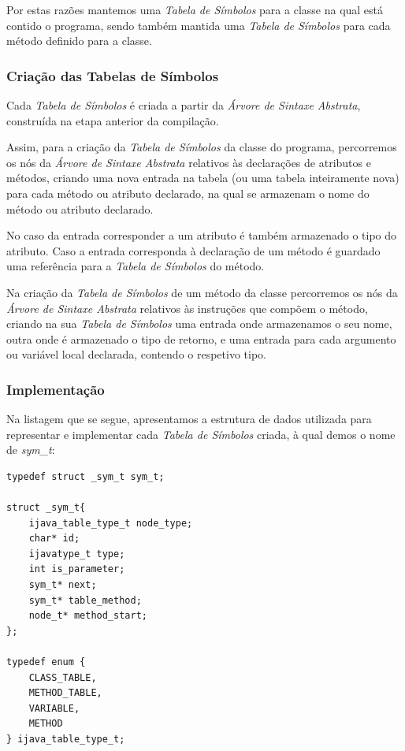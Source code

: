 \documentclass[11pt,a4paper]{article}
\begin{document}
	Por estas razões mantemos uma \emph{Tabela de Símbolos} para a classe na qual está contido o programa, sendo também mantida uma \emph{Tabela de Símbolos} para cada método definido para a classe.
	
	\subsubsection{Criação das Tabelas de Símbolos}
	
	Cada \emph{Tabela de Símbolos} é criada a partir da \emph{Árvore de Sintaxe Abstrata}, construída na etapa anterior da compilação.
	
	Assim, para a criação da \emph{Tabela de Símbolos} da classe do programa, percorremos os nós da \emph{Árvore de Sintaxe Abstrata} relativos às declarações de atributos e métodos, criando uma nova entrada na tabela (ou uma tabela inteiramente nova) para cada método ou atributo declarado, na qual se armazenam o nome do método ou atributo declarado.
	
	No caso da entrada corresponder a um atributo é também armazenado o tipo do atributo. Caso a entrada corresponda à declaração de um método é guardado uma referência para a \emph{Tabela de Símbolos} do método.
	
	Na criação da \emph{Tabela de Símbolos} de um método da classe percorremos os nós da \emph{Árvore de Sintaxe Abstrata} relativos às instruções que compõem o método, criando na sua \emph{Tabela de Símbolos} uma entrada onde armazenamos o seu nome, outra onde é armazenado o tipo de retorno, e uma entrada para cada argumento ou variável local declarada, contendo o respetivo tipo.
	
	\subsubsection{Implementação}
	
	
	
	Na listagem que se segue, apresentamos a estrutura de dados utilizada para representar e implementar cada \emph{Tabela de Símbolos} criada, à qual demos o nome de \emph{sym\_t}:
	
	\begin{lstlisting}
typedef struct _sym_t sym_t;	

struct _sym_t{
	ijava_table_type_t node_type;
	char* id;
	ijavatype_t type;
	int is_parameter;
	sym_t* next;
	sym_t* table_method;
	node_t* method_start;
};

typedef enum {
	CLASS_TABLE,
	METHOD_TABLE,
	VARIABLE,
	METHOD
} ijava_table_type_t;
	\end{lstlisting}
	
\end{document}
